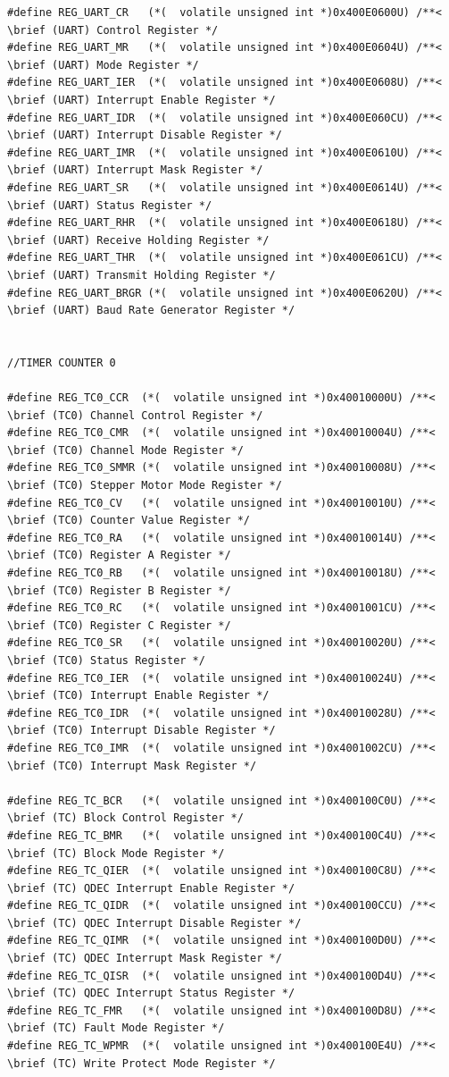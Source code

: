 \documentclass[12pt]{article}
\begin{document}
\begin{tiny}
\begin{verbatim}
#define REG_UART_CR   (*(  volatile unsigned int *)0x400E0600U) /**< \brief (UART) Control Register */
#define REG_UART_MR   (*(  volatile unsigned int *)0x400E0604U) /**< \brief (UART) Mode Register */
#define REG_UART_IER  (*(  volatile unsigned int *)0x400E0608U) /**< \brief (UART) Interrupt Enable Register */
#define REG_UART_IDR  (*(  volatile unsigned int *)0x400E060CU) /**< \brief (UART) Interrupt Disable Register */
#define REG_UART_IMR  (*(  volatile unsigned int *)0x400E0610U) /**< \brief (UART) Interrupt Mask Register */
#define REG_UART_SR   (*(  volatile unsigned int *)0x400E0614U) /**< \brief (UART) Status Register */
#define REG_UART_RHR  (*(  volatile unsigned int *)0x400E0618U) /**< \brief (UART) Receive Holding Register */
#define REG_UART_THR  (*(  volatile unsigned int *)0x400E061CU) /**< \brief (UART) Transmit Holding Register */
#define REG_UART_BRGR (*(  volatile unsigned int *)0x400E0620U) /**< \brief (UART) Baud Rate Generator Register */


//TIMER COUNTER 0

#define REG_TC0_CCR  (*(  volatile unsigned int *)0x40010000U) /**< \brief (TC0) Channel Control Register */
#define REG_TC0_CMR  (*(  volatile unsigned int *)0x40010004U) /**< \brief (TC0) Channel Mode Register */
#define REG_TC0_SMMR (*(  volatile unsigned int *)0x40010008U) /**< \brief (TC0) Stepper Motor Mode Register */
#define REG_TC0_CV   (*(  volatile unsigned int *)0x40010010U) /**< \brief (TC0) Counter Value Register */
#define REG_TC0_RA   (*(  volatile unsigned int *)0x40010014U) /**< \brief (TC0) Register A Register */
#define REG_TC0_RB   (*(  volatile unsigned int *)0x40010018U) /**< \brief (TC0) Register B Register */
#define REG_TC0_RC   (*(  volatile unsigned int *)0x4001001CU) /**< \brief (TC0) Register C Register */
#define REG_TC0_SR   (*(  volatile unsigned int *)0x40010020U) /**< \brief (TC0) Status Register */
#define REG_TC0_IER  (*(  volatile unsigned int *)0x40010024U) /**< \brief (TC0) Interrupt Enable Register */
#define REG_TC0_IDR  (*(  volatile unsigned int *)0x40010028U) /**< \brief (TC0) Interrupt Disable Register */
#define REG_TC0_IMR  (*(  volatile unsigned int *)0x4001002CU) /**< \brief (TC0) Interrupt Mask Register */

#define REG_TC_BCR   (*(  volatile unsigned int *)0x400100C0U) /**< \brief (TC) Block Control Register */
#define REG_TC_BMR   (*(  volatile unsigned int *)0x400100C4U) /**< \brief (TC) Block Mode Register */
#define REG_TC_QIER  (*(  volatile unsigned int *)0x400100C8U) /**< \brief (TC) QDEC Interrupt Enable Register */
#define REG_TC_QIDR  (*(  volatile unsigned int *)0x400100CCU) /**< \brief (TC) QDEC Interrupt Disable Register */
#define REG_TC_QIMR  (*(  volatile unsigned int *)0x400100D0U) /**< \brief (TC) QDEC Interrupt Mask Register */
#define REG_TC_QISR  (*(  volatile unsigned int *)0x400100D4U) /**< \brief (TC) QDEC Interrupt Status Register */
#define REG_TC_FMR   (*(  volatile unsigned int *)0x400100D8U) /**< \brief (TC) Fault Mode Register */
#define REG_TC_WPMR  (*(  volatile unsigned int *)0x400100E4U) /**< \brief (TC) Write Protect Mode Register */


\end{verbatim}
\end{tiny}
\end{document}
